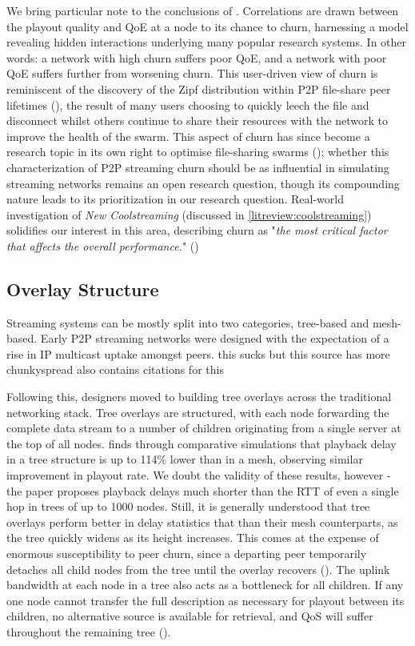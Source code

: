 \documentclass[12pt,a4paper]{article}
\begin{document}
We bring particular note to the conclusions of \cite{Vassilakis2010}. Correlations are drawn between the playout quality and QoE at a node to its chance to churn, harnessing a model revealing hidden interactions underlying many popular research systems. In other words: a network with high churn suffers poor QoE, and a network with poor QoE suffers further from worsening churn. This user-driven view of churn is reminiscent of the discovery of the Zipf distribution within P2P file-share peer lifetimes (\cite{Pouwelse2005}), the result of many users choosing to quickly leech the file and disconnect whilst others continue to share their resources with
the network to improve the health of the swarm. This aspect of churn has since become a research topic in its own right to optimise file-sharing swarms (\cite{Bustamante}); whether this characterization of P2P streaming churn should be as influential in simulating streaming networks remains an open research question, though its compounding nature leads to its prioritization in our research question. Real-world investigation of \textit{New Coolstreaming} (discussed in \ref{litreview:coolstreaming}) solidifies our interest in this area, describing churn as "\textit{the most critical factor that affects the overall performance.}" (\cite{Li2007})

\subsection{Overlay Structure} \label{litreview:structure}
Streaming systems can be mostly split into two categories, tree-based and mesh-based. Early P2P streaming networks were designed with the expectation of a rise in IP multicast uptake amongst peers. this sucks but this source \cite{Ghoshal2007} has more chunkyspread also contains citations for this

Following this, designers moved to building tree overlays across the traditional networking stack. Tree overlays are structured, with each node forwarding the complete data stream to a number of children originating from a single server at the top of all nodes. \cite{Goh2013} finds through comparative simulations that playback delay in a tree structure is up to 114\% lower than in a mesh, observing similar improvement in playout rate. We doubt the validity of these results, however - the paper proposes playback delays much shorter than the RTT of even a single hop in trees of up to 1000 nodes. Still, it is generally understood that tree overlays perform better in delay statistics that than their mesh counterparts, as the tree quickly widens as its height increases.  This comes at the expense of enormous susceptibility to peer churn, since a departing peer temporarily detaches all child nodes from the tree until the overlay recovers (\cite{Ghoshal2007}). The uplink bandwidth at each node in a tree also acts as a bottleneck for all children. If any one node cannot transfer the full description as necessary for playout between its children, no alternative source is available for retrieval, and QoS will suffer throughout the remaining tree (\cite{Magharei2007}).
\end{document}

